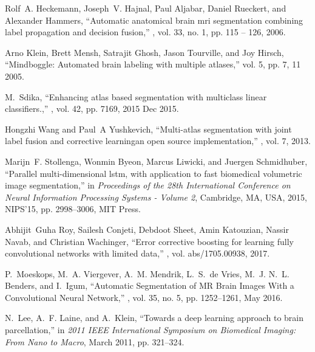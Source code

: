 \documentclass{article}
\begin{document}

\begin{thebibliography}{10}

Rolf~A. Heckemann, Joseph~V. Hajnal, Paul Aljabar, Daniel Rueckert, and
  Alexander Hammers,
\newblock ``Automatic anatomical brain mri segmentation combining label
  propagation and decision fusion,''
, vol. 33, no. 1, pp. 115 -- 126, 2006.

Arno Klein, Brett Mensh, Satrajit Ghosh, Jason Tourville, and Joy Hirsch,
\newblock ``Mindboggle: Automated brain labeling with multiple atlases,''
\newblock vol. 5, pp. 7, 11 2005.

M.~Sdika,
\newblock ``Enhancing atlas based segmentation with multiclass linear
  classifiers.,''
, vol. 42, pp. 7169, 2015 Dec 2015.

Hongzhi Wang and Paul~A Yushkevich,
\newblock ``Multi-atlas segmentation with joint label fusion and corrective
  learningan open source implementation,''
, vol. 7, 2013.

Marijn~F. Stollenga, Wonmin Byeon, Marcus Liwicki, and Juergen Schmidhuber,
\newblock ``Parallel multi-dimensional lstm, with application to fast
  biomedical volumetric image segmentation,''
\newblock in {\em Proceedings of the 28th International Conference on Neural
  Information Processing Systems - Volume 2}, Cambridge, MA, USA, 2015,
  NIPS'15, pp. 2998--3006, MIT Press.

Abhijit~Guha Roy, Sailesh Conjeti, Debdoot Sheet, Amin Katouzian, Nassir Navab,
  and Christian Wachinger,
\newblock ``Error corrective boosting for learning fully convolutional networks
  with limited data,''
, vol. abs/1705.00938, 2017.

P.~Moeskops, M.~A. Viergever, A.~M. Mendrik, L.~S.~de Vries, M.~J. N.~L.
  Benders, and I.~Igum,
\newblock ``Automatic {Segmentation} of {MR} {Brain} {Images} {With} a
  {Convolutional} {Neural} {Network},''
, vol. 35, no. 5, pp.
  1252--1261, May 2016.

N.~Lee, A.~F. Laine, and A.~Klein,
\newblock ``Towards a deep learning approach to brain parcellation,''
\newblock in {\em 2011 IEEE International Symposium on Biomedical Imaging: From
  Nano to Macro}, March 2011, pp. 321--324.


\end{thebibliography}
\end{document}
